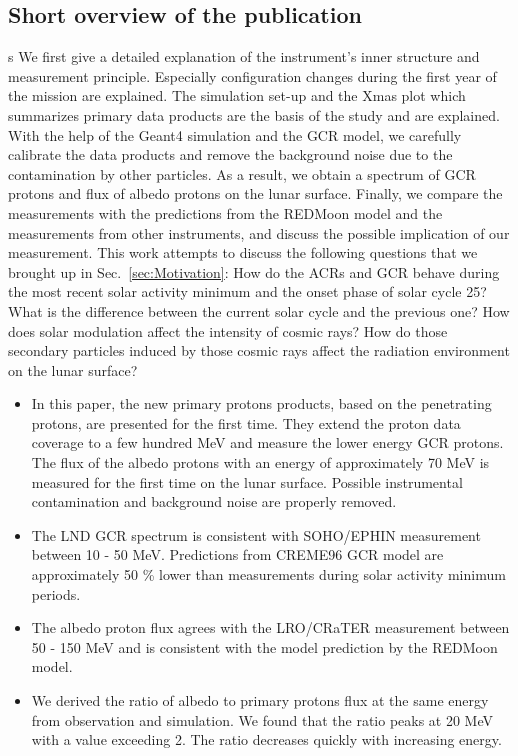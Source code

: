 \subsection*{Short overview of the publication}
s
We first give a detailed explanation of the instrument's inner structure and measurement principle. Especially configuration changes during the first year of the mission are explained. The simulation set-up and the Xmas plot which summarizes primary data products are the basis of the study and are explained.
With the help of the \ac{Geant4} simulation and the \ac{GCR} model, we carefully calibrate the data products and remove the background noise due to the contamination by other particles. As a result, we obtain a spectrum of \ac{GCR} protons and flux of albedo protons on the lunar surface. Finally, we compare the measurements with the predictions from the \ac{REDMoon} model and the measurements from other instruments, and discuss the possible implication of our measurement.
This work attempts to discuss the following questions that we brought up in Sec.~\ref{sec:Motivation}: 
How do the \acp{ACR} and \ac{GCR} behave during the most recent solar activity minimum and the onset phase of solar cycle 25? What is the difference between the current solar cycle and the previous one? How does solar modulation affect the intensity of cosmic rays? How do those secondary particles induced by those cosmic rays affect the radiation environment on the lunar surface?


\begin{itemize}
    \item   In this paper, the new primary protons products, based on the penetrating protons, are presented for the first time. They extend the proton data coverage to a few hundred MeV and measure the lower energy \ac{GCR} protons. The flux of the albedo protons with an energy of approximately 70 MeV is measured for the first time on the lunar surface. Possible instrumental contamination and background noise are properly removed.
    \item The \ac{LND} \ac{GCR} spectrum is consistent with \ac{SOHO}/\ac{EPHIN} measurement between 10 - 50 MeV.  Predictions from CREME96 \citep{Tylka1997ITNS} \ac{GCR} model are approximately 50 \% lower than measurements during solar activity minimum periods.
    \item  The albedo proton flux agrees with the \ac{LRO}/\ac{CRaTER} measurement between 50 - 150 MeV and is consistent with the model prediction by the \ac{REDMoon} model.
    \item We derived the ratio of albedo to primary protons flux at the same energy from observation and simulation. We found that the ratio peaks at 20 MeV with a value exceeding 2. The ratio decreases quickly with increasing energy.
\end{itemize}




